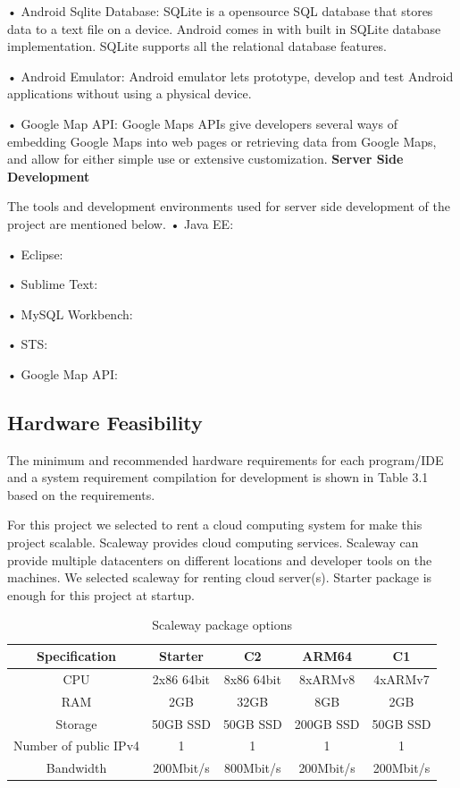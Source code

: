 • Android Sqlite Database: SQLite is a opensource SQL database that stores data to a text file on a device. Android comes in with built in SQLite database implementation. SQLite supports all the relational database features\cite{androidStudioSqlite}.
\newline

• Android Emulator: Android emulator lets prototype, develop and test Android applications without using a physical device\cite{androidEmulator}.
\newline

• Google Map API: Google Maps APIs give developers several ways of embedding Google Maps into web pages or retrieving data from Google Maps, and allow for either simple use or extensive customization\cite{googleMapAPI}.
\newline
\textbf{Server Side Development}

\newline
The tools and development environments used for server side development of the
project are mentioned below.
\newline
• Java EE:

• Eclipse:

• Sublime Text:

• MySQL Workbench:

• STS:

• Google Map API:


\subsection{Hardware Feasibility}
The minimum and recommended hardware requirements for each program/IDE and
a system requirement compilation for development is shown in Table 3.1 based on
the requirements.

For this project we selected to rent a cloud computing system for make this project scalable. Scaleway\cite{scaleway} provides cloud computing services. Scaleway can provide multiple datacenters on different locations and developer tools on the machines. We selected scaleway for renting cloud server(s). Starter package is enough for this project at startup.

\begin{table}[!ht]
\centering
\caption{Scaleway package options}
\label{minreq}
\begin{tabular}{|c|c|c|c|c|}
\hline
\textbf{Specification}& \textbf{Starter} & \textbf{C2}  & \textbf{ARM64} & \textbf{C1} \\ \hline
CPU                             & 2x86 64bit & 8x86 64bit  & 8xARMv8 & 4xARMv7 \\ \hline
RAM                             & 2GB & 32GB & 8GB & 2GB \\ \hline
Storage                         & 50GB SSD & 50GB SSD & 200GB SSD & 50GB SSD \\ \hline
Number of public IPv4  & 1 & 1 & 1 & 1  \\ \hline
Bandwidth                       & 200Mbit/s & 800Mbit/s & 200Mbit/s & 200Mbit/s \\ \hline
\end{tabular}
\end{table}

